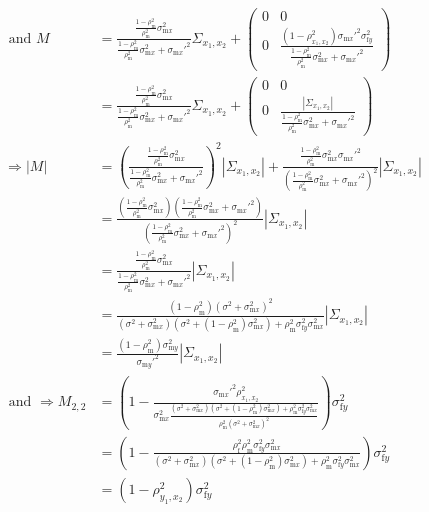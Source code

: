 \documentclass{article}
\newcommand{\x}[1]{\text{#1}}
\begin{document}
\begin{landscape}
\begin{align*}
\end{align*}
\begin{align*}
\text{ and } M&=\frac{\frac{1-\rho_\x{m}^2}{\rho_\x{m}^2}\sigma_{\x{m}x}^2}{\frac{1-\rho_\x{m}^2}{\rho_\x{m}^2}\sigma_{\x{m}x}^2+\sigma_{\x{m}x}'^2}\Sigma_{x_1,x_2}+\left(\begin{array}{cc}0 & 0 \\ 0 & \frac{(1-\rho_{x_1,x_2}^2)\sigma_{\x{m}x}'^2\sigma_{\x{f}y}^2}{\frac{1-\rho_\x{m}^2}{\rho_\x{m}^2}\sigma_{\x{m}x}^2+\sigma_{\x{m}x}'^2} \end{array}\right)
\\&=\frac{\frac{1-\rho_\x{m}^2}{\rho_\x{m}^2}\sigma_{\x{m}x}^2}{\frac{1-\rho_\x{m}^2}{\rho_\x{m}^2}\sigma_{\x{m}x}^2+\sigma_{\x{m}x}'^2}\Sigma_{x_1,x_2}+\left(\begin{array}{cc}0 & 0 \\ 0 & \frac{|\Sigma_{x_1,x_2}|}{\frac{1-\rho_\x{m}^2}{\rho_\x{m}^2}\sigma_{\x{m}x}^2+\sigma_{\x{m}x}'^2} \end{array}\right)
\\ \Rightarrow |M| &=\left(\frac{\frac{1-\rho_\x{m}^2}{\rho_\x{m}^2}\sigma_{\x{m}x}^2}{\frac{1-\rho_\x{m}^2}{\rho_\x{m}^2}\sigma_{\x{m}x}^2+\sigma_{\x{m}x}'^2}\right)^2|\Sigma_{x_1,x_2}|+\frac{\frac{1-\rho_\x{m}^2}{\rho_\x{m}^2}\sigma_{\x{m}x}^2\sigma_{\x{m}x}'^2}{\left(\frac{1-\rho_\x{m}^2}{\rho_\x{m}^2}\sigma_{\x{m}x}^2+\sigma_{\x{m}x}'^2\right)^2}|\Sigma_{x_1,x_2}|
\\&=\frac{\left(\frac{1-\rho_\x{m}^2}{\rho_\x{m}^2}\sigma_{\x{m}x}^2\right)\left(\frac{1-\rho_\x{m}^2}{\rho_\x{m}^2}\sigma_{\x{m}x}^2+\sigma_{\x{m}x}'^2\right)}{\left(\frac{1-\rho_\x{m}^2}{\rho_\x{m}^2}\sigma_{\x{m}x}^2+\sigma_{\x{m}x}'^2\right)^2}|\Sigma_{x_1,x_2}|
\\&=\frac{\frac{1-\rho_\x{m}^2}{\rho_\x{m}^2}\sigma_{\x{m}x}^2}{\frac{1-\rho_\x{m}^2}{\rho_\x{m}^2}\sigma_{\x{m}x}^2+\sigma_{\x{m}x}'^2}|\Sigma_{x_1,x_2}|
\\&=\frac{(1-\rho_\x{m}^2)(\sigma^2+\sigma_{\x{m}x}^2)^2}{(\sigma^2+\sigma_{\x{m}x}^2)(\sigma^2+(1-\rho_\x{m}^2)\sigma_{\x{m}x}^2)+\rho_\x{m}^2\sigma_{\x{f}y}^2\sigma_{\x{m}x}^2}|\Sigma_{x_1,x_2}|
\\&=\frac{(1-\rho_\x{m}^2)\sigma_{\x{m}y}^2}{\sigma_{\x{m}y}'^2}|\Sigma_{x_1,x_2}|
\\\text{ and } \Rightarrow M_{2,2}&=\left(1-\frac{\sigma_{\x{m}x}'^2\rho_{x_1,x_2}^2}{\sigma_{\x{m}x}^2\frac{(\sigma^2+\sigma_{\x{m}x}^2)(\sigma^2+(1-\rho_\x{m}^2)\sigma_{\x{m}x}^2)+\rho_\x{m}^2\sigma_{\x{f}y}^2\sigma_{\x{m}x}^2}{\rho_\x{m}^2(\sigma^2+\sigma_{\x{m}x}^2)^2}}\right)\sigma_{\x{f}y}^2
\\&=\left(1-\frac{\rho_\x{f}^2\rho_\x{m}^2\sigma_{\x{f}y}^2\sigma_{\x{m}x}^2}{(\sigma^2+\sigma_{\x{m}x}^2)(\sigma^2+(1-\rho_\x{m}^2)\sigma_{\x{m}x}^2)+\rho_\x{m}^2\sigma_{\x{f}y}^2\sigma_{\x{m}x}^2}\right)\sigma_{\x{f}y}^2
\\&=\left(1-\rho_{y_1,x_2}^2\right)\sigma_{\x{f}y}^2
\end{align*}


\end{landscape}
\end{document}
